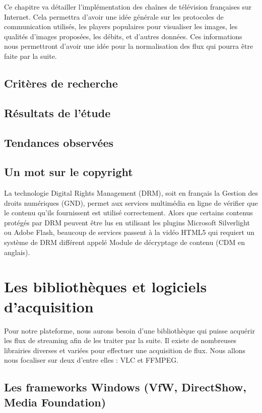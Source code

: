 \documentclass{polytech/polytech}
\begin{document}
Ce chapitre va détailler l'implémentation des chaînes de télévision françaises sur Internet. Cela permettra d'avoir une idée générale sur les protocoles de communication utilisés, les players populaires pour visualiser les images, les qualités d'images proposées, les débits, et d'autres données. Ces informations nous permettront d'avoir une idée pour la normalisation des flux qui pourra être faite par la suite. 


\section{Critères de recherche}


\section{Résultats de l'étude}


\section{Tendances observées}


\section{Un mot sur le copyright}


La technologie Digital Rights Management (DRM), soit en français la Gestion des droits numériques (GND), permet aux services multimédia en ligne de vérifier que le contenu qu'ils fournissent est utilisé correctement. Alors que certains contenus protégés par DRM peuvent être lus en utilisant les plugins Microsoft Silverlight ou Adobe Flash, beaucoup de services passent à la vidéo HTML5 qui requiert un système de DRM différent appelé Module de décryptage de contenu (CDM en anglais).



\chapter{Les bibliothèques et logiciels d'acquisition}

Pour notre plateforme, nous aurons besoin d’une bibliothèque qui puisse acquérir les flux de streaming afin de les traiter par la suite. Il existe de nombreuses librairies diverses et variées pour effectuer une acquisition de flux. Nous allons nous focaliser sur deux d’entre elles : VLC et FFMPEG.

\section{Les frameworks Windows (VfW, DirectShow, Media Foundation)}
\end{document}

